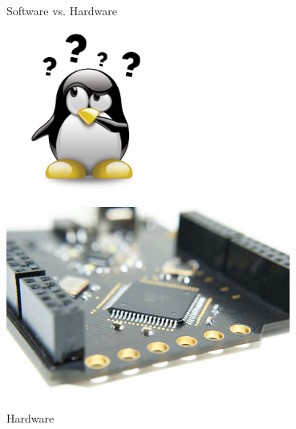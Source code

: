 \documentclass{beamer}
\begin{document}

\begin{frame}
  \begin{center}
    \begin{Huge}
      Software vs. Hardware
    \end{Huge}

    \includegraphics[width=0.4\textwidth]{../img/tux-question-3}
    \end{center}
\end{frame}

\begin{frame}
  \begin{center} 
    \includegraphics[width=0.7\textwidth]{../img/hardware}
    \begin{Huge} Hardware \end{Huge} 
  \end{center}
\end{frame}
\end{document}
